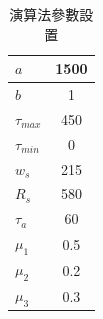 \begin{table}[h!]
	\centering
	\caption{演算法參數設置}
	\label{t:exp:parameter}
	\begin{tabular}{ | l | c |}
		\hline
		$a$		& 1500	\\ \hline
		$b$		& 1	\\ \hline
		$\tau_{max}$	& 450	\\ \hline
		$\tau_{min}$	& 0	\\ \hline
		$w_s$		& 215	\\ \hline
		$R_s$		& 580	\\ \hline
		$\tau_a$	& 60	\\ \hline
		$\mu_1$		& 0.5	\\ \hline
		$\mu_2$		& 0.2	\\ \hline
		$\mu_3$		& 0.3	\\ \hline
	\end{tabular}
\end{table}


